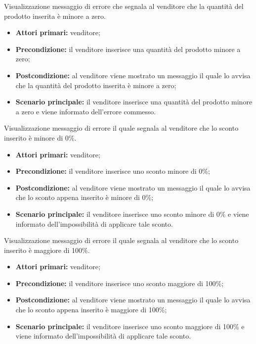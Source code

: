 \hypertarget{QuantitàErrata}{}
Visualizzazione messaggio di errore che segnala al venditore che la quantità del prodotto inserita è minore a zero.
\begin{itemize}
    \item \textbf{Attori primari:} venditore;
    \item \textbf{Precondizione:} il venditore inserisce una quantità del prodotto minore a zero;
    \item \textbf{Postcondizione:} al venditore viene mostrato un messaggio il quale lo avvisa che la quantità del prodotto inserita è minore a zero;
    \item \textbf{Scenario principale:} il venditore inserisce una quantità del prodotto minore a zero e viene informato dell'errore commesso.
\end{itemize}

Visualizzazione messaggio di errore il quale segnala al venditore che lo sconto inserito è minore di 0\%.
\begin{itemize}
    \item \textbf{Attori primari:} venditore;
    \item \textbf{Precondizione:} il venditore inserisce uno sconto minore di 0\%;
    \item \textbf{Postcondizione:} al venditore viene mostrato un messaggio il quale lo avvisa che lo sconto appena inserito è minore di 0\%;
    \item \textbf{Scenario principale:} il venditore inserisce uno sconto minore di 0\% e viene informato dell'impossibilità di applicare tale sconto.
\end{itemize}

Visualizzazione messaggio di errore il quale segnala al venditore che lo sconto inserito è maggiore di 100\%.
\begin{itemize}
    \item \textbf{Attori primari:} venditore;
    \item \textbf{Precondizione:} il venditore inserisce uno sconto maggiore di 100\%;
    \item \textbf{Postcondizione:} al venditore viene mostrato un messaggio il quale lo avvisa che lo sconto appena inserito è maggiore di 100\%;
    \item \textbf{Scenario principale:} il venditore inserisce uno sconto maggiore di 100\% e viene informato dell'impossibilità di applicare tale sconto.
\end{itemize}

